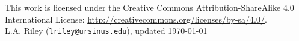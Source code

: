 \documentclass[12pt]{article}
\begin{document}
{\footnotesize
  \noindent
  \hrulefill
  
  \noindent
  This work is licensed under the Creative Commons
  Attribution-ShareAlike 4.0 International License: 
  \url{http://creativecommons.org/licenses/by-sa/4.0/}.\\

  \noindent
  L.A. Riley (\texttt{lriley@ursinus.edu}), updated \today
}
\end{document}
